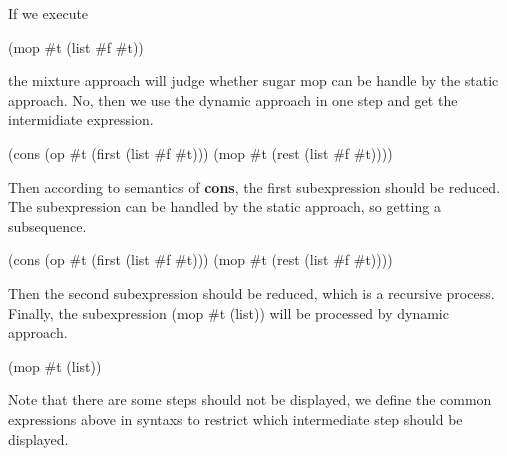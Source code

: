 If we execute 
\begin{Codes}
(mop \#t (list \#f \#t))
\end{Codes}
 the mixture approach will judge whether sugar mop can be handle by the static approach. No, then we use the dynamic approach in one step and get the intermidiate expression.
\begin{Codes}
(cons (op \#t (first (list \#f \#t))) (mop \#t (rest (list \#f \#t))))
\end{Codes}
Then according to semantics of {\bfseries cons}, the first subexpression should be reduced. The subexpression can be handled by the static approach, so getting a subsequence.
\begin{Codes}
	(cons (op \#t (first (list \#f \#t))) (mop \#t (rest (list \#f \#t))))
\end{Codes}
Then the second subexpression should be reduced, which is a recursive process. Finally, the subexpression (mop \#t (list)) will be processed by dynamic approach.
\begin{Codes}
	(mop \#t (list))
\end{Codes}
Note that there are some steps should not be displayed, we define the common expressions above in syntaxs to restrict which intermediate step should be displayed.


